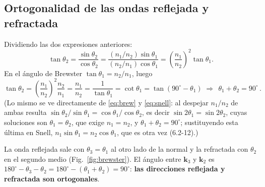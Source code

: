 \documentclass{article}
\newcommand{\kv}{\mathbf{k}}
\begin{document}
\subsection*{Ortogonalidad de las ondas reflejada y refractada}

Dividiendo las dos expresiones anteriores:
\[
\tan\theta_2=\frac{\sin\theta_2}{\cos\theta_2}=\frac{(n_1/n_2)\sin\theta_1}{(n_2/n_1)\cos\theta_1}
=\left(\frac{n_1}{n_2}\right)^2\tan\theta_1 .
\]
En el ángulo de Brewster $\tan\theta_1=n_2/n_1$, luego
\[
\tan\theta_2=\left(\frac{n_1}{n_2}\right)^2\frac{n_2}{n_1}=\frac{n_1}{n_2}=\frac{1}{\tan\theta_1}=\cot\theta_1=\tan\!\left(90^\circ-\theta_1\right)
\;\Longrightarrow\;
\boxed{\,\theta_1+\theta_2=90^\circ\,}.
\]
(Lo mismo se ve directamente de \eqref{eq:brew} y \eqref{eq:snell}: al despejar $n_1/n_2$ de ambas resulta
$\sin\theta_2/\sin\theta_1=\cos\theta_1/\cos\theta_2$, es decir $\sin2\theta_1=\sin2\theta_2$, cuyas
soluciones son $\theta_1=\theta_2$, que exige $n_1=n_2$, y $\theta_1+\theta_2=90^\circ$;
sustituyendo esta última en Snell, $n_1\sin\theta_1=n_2\cos\theta_1$, que es otra vez (6.2-12).)

La onda reflejada sale con $\theta_3=\theta_1$ al otro lado de la normal y la refractada con
$\theta_2$ en el segundo medio (Fig.~\ref{fig:brewster}). El ángulo entre $\kv_3$ y $\kv_2$ es
$180^\circ-\theta_3-\theta_2=180^\circ-(\theta_1+\theta_2)=90^\circ$: \textbf{las direcciones
reflejada y refractada son ortogonales}.
\end{document}
